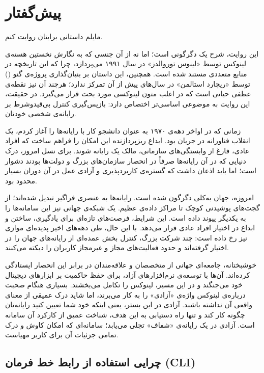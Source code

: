 \chapter*{پیش‌گفتار}

مایلم داستانی برایتان روایت کنم.

این روایت، شرح یک دگرگونی است؛ اما نه از آن جنسی که به نگارش نخستین هسته‌ی لینوکس توسط «لینوس توروالدز» در سال ۱۹۹۱ می‌پردازد، چرا که این تاریخچه در منابع متعددی مستند شده است. همچنین، این داستان بر بنیان‌گذاری پروژه‌ی گنو () توسط «ریچارد استالمن» در سال‌های پیش از آن تمرکز ندارد؛ هرچند آن نیز نقطه‌ی عطفی حیاتی است که در اغلب متون لینوکسی مورد بحث قرار می‌گیرد. در حقیقت، این روایت به موضوعی اساسی‌تر اختصاص دارد: بازپس‌گیری کنترل بی‌قیدوشرط بر رایانه‌ی شخصی خودتان.

زمانی که در اواخر دهه‌ی ۱۹۷۰ به عنوان دانشجو کار با رایانه‌ها را آغاز کردم، یک انقلاب فناورانه در جریان بود. ابداع ریزپردازنده این امکان را فراهم ساخت که افراد عادی، فارغ از وابستگی‌های سازمانی، مالک یک رایانه شوند. برای نسل امروز، درک دنیایی که در آن رایانه‌ها صرفاً در انحصار سازمان‌های بزرگ و دولت‌ها بودند دشوار است؛ اما باید اذعان داشت که گستره‌ی کاربردپذیری و آزادی عمل در آن دوران بسیار محدود بود.

امروزه، جهان به‌کلی دگرگون شده است. رایانه‌ها به عنصری فراگیر تبدیل شده‌اند؛ از گجت‌های پوشیدنی کوچک تا مراکز داده‌ی عظیم. یک شبکه‌ی جهانی نیز این سامانه‌ها را به یکدیگر پیوند داده است. این شرایط، فرصت‌های تازه‌ای برای یادگیری، ساختن و ابداع در اختیار افراد عادی قرار می‌دهد. با این حال، طی دهه‌های اخیر پدیده‌ای موازی نیز رخ داده است: چند شرکت بزرگ، کنترل بخش عمده‌ای از رایانه‌های جهان را در اختیار گرفته‌اند و حدود فعالیت‌های مجاز و غیرمجاز کاربران را دیکته می‌کنند.

خوشبختانه، جامعه‌ای جهانی از متخصصان و علاقه‌مندان در برابر این انحصار ایستادگی کرده‌اند. آن‌ها با توسعه‌ی نرم‌افزارهای آزاد، برای حفظ حاکمیت بر ابزارهای دیجیتال خود می‌جنگند و در این مسیر، لینوکس را تکامل می‌بخشند. بسیاری هنگام صحبت درباره‌ی لینوکس واژه‌ی «آزادی» را به کار می‌برند، اما شاید درک عمیقی از معنای واقعی آن نداشته باشند. آزادی در این بستر، یعنی اینکه خود شما تعیین کنید رایانه‌تان چگونه کار کند و تنها راه دستیابی به این هدف، شناخت عمیق از کارکرد آن سامانه است. آزادی در یک رایانه‌ی «شفاف» تجلی می‌یابد؛ سامانه‌ای که امکان کاوش و درک تمامی جزئیات آن برای کاربر مهیاست.

\section*{چرایی استفاده از رابط خط فرمان (CLI)}

